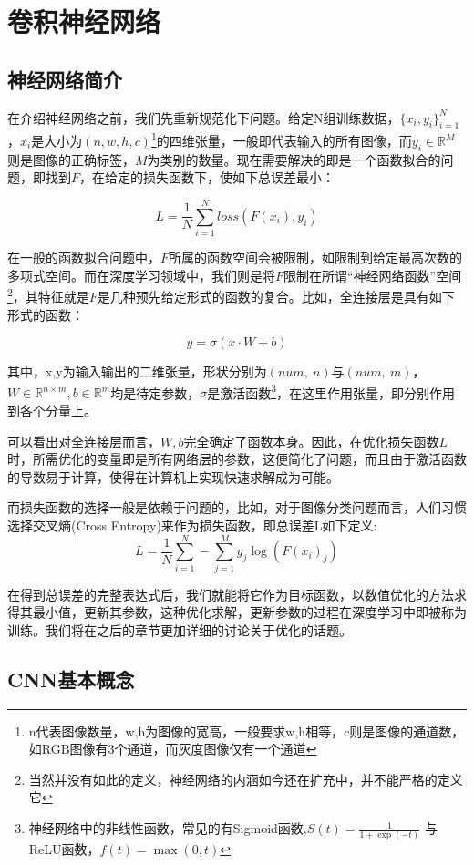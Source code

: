 \chapter{卷积神经网络}

\section{神经网络简介}

在介绍神经网络之前，我们先重新规范化下问题。给定N组训练数据，$\{x_i, y_i\}_{i=1}^N$，$x_i$是大小为$(n, w, h, c)$\footnote{n代表图像数量，w,h为图像的宽高，一般要求w,h相等，c则是图像的通道数，如RGB图像有3个通道，而灰度图像仅有一个通道}的四维张量，一般即代表输入的所有图像，而$y_i \in \mathbb{R}^M$则是图像的正确标签，$M$为类别的数量。现在需要解决的即是一个函数拟合的问题，即找到$F$，在给定的损失函数下，使如下总误差最小：

\[
L =\frac{1}{N}\sum_{i=1}^N loss(F(x_i), y_i)
\]

在一般的函数拟合问题中，$F$所属的函数空间会被限制，如限制到给定最高次数的多项式空间。而在深度学习领域中，我们则是将$F$限制在所谓“神经网络函数”空间\footnote{当然并没有如此的定义，神经网络的内涵如今还在扩充中，并不能严格的定义它}，其特征就是$F$是几种预先给定形式的函数的复合。比如，全连接层是具有如下形式的函数：

\[
	y = \sigma (x \cdot W + b)
\]

其中，x,y为输入输出的二维张量，形状分别为$(num,\  n)$与$(num,\  m)$，$W \in \mathbb{R}^{n \times m}, b \in \mathbb{R}^m $均是待定参数，$\sigma$是激活函数\footnote{神经网络中的非线性函数，常见的有Sigmoid函数,$S(t) = \frac{1}{1 + \exp(-t)}$ 与ReLU函数，$f(t) = \max(0, t)$}，在这里作用张量，即分别作用到各个分量上。

可以看出对全连接层而言，$W,b$完全确定了函数本身。因此，在优化损失函数$L$时，所需优化的变量即是所有网络层的参数，这便简化了问题，而且由于激活函数的导数易于计算，使得在计算机上实现快速求解成为可能。

而损失函数的选择一般是依赖于问题的，比如，对于图像分类问题而言，人们习惯选择交叉熵(Cross Entropy)来作为损失函数，即总误差L如下定义:
\[
	L = \frac1N \sum_{i=1}^N - \sum_{j=1}^{M} y_j \log (F(x_i)_j)
\]

在得到总误差的完整表达式后，我们就能将它作为目标函数，以数值优化的方法求得其最小值，更新其参数，这种优化求解，更新参数的过程在深度学习中即被称为训练。我们将在之后的章节更加详细的讨论关于优化的话题。

\section{CNN基本概念}

